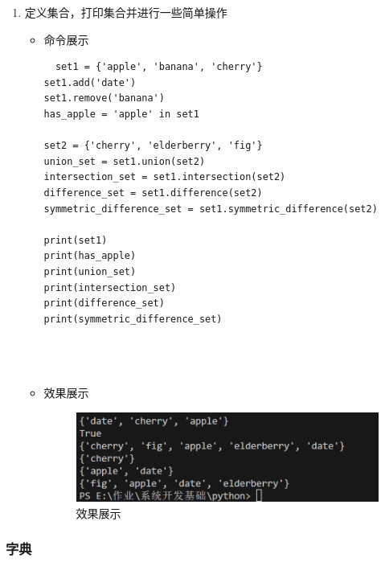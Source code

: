 \documentclass[UTF8]{ctexart}
\begin{document}
\begin{enumerate}
  \item 定义集合，打印集合并进行一些简单操作
  \begin{itemize}
  \item 命令展示
  \begin{verbatim}
  set1 = {'apple', 'banana', 'cherry'}
set1.add('date')
set1.remove('banana')
has_apple = 'apple' in set1

set2 = {'cherry', 'elderberry', 'fig'}
union_set = set1.union(set2)
intersection_set = set1.intersection(set2)
difference_set = set1.difference(set2)
symmetric_difference_set = set1.symmetric_difference(set2)

print(set1)
print(has_apple)
print(union_set)
print(intersection_set)
print(difference_set)
print(symmetric_difference_set)


    
  \end{verbatim}

  \item 效果展示
  \begin{figure}[H]
    \centering
    \includegraphics[width=\textwidth]{23} %
    \caption{效果展示}
  
  \end{figure}
\end{itemize}
\end{enumerate}
























\subsubsection{字典}
\end{document}
